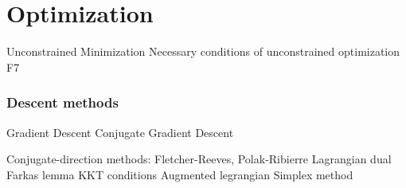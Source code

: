 \part{Optimization}

	Unconstrained Minimization
	Necessary conditions of unconstrained optimization F7



\section{Descent methods}
	Gradient Descent
	Conjugate Gradient Descent



Conjugate-direction methods: Fletcher-Reeves, Polak-Ribierre
Lagrangian dual
Farkas lemma
KKT conditions
Augmented legrangian
Simplex method

